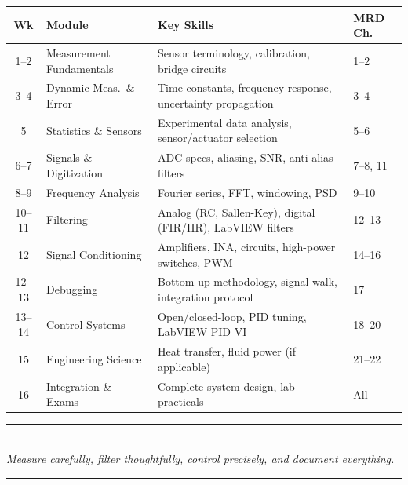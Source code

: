\documentclass[11pt,letterpaper]{article}
\begin{document}
\begin{table}[htbp]
\centering\small
\begin{tabularx}{\textwidth}{@{} c l X l @{}}
\toprule
\textbf{Wk} & \textbf{Module} & \textbf{Key Skills} & \textbf{MRD Ch.} \\
\midrule
1--2 & Measurement Fundamentals & Sensor terminology, calibration, bridge circuits & 1--2 \\
3--4 & Dynamic Meas.\ \& Error & Time constants, frequency response, uncertainty propagation & 3--4 \\
5 & Statistics \& Sensors & Experimental data analysis, sensor/actuator selection & 5--6 \\
6--7 & Signals \& Digitization & ADC specs, aliasing, SNR, anti-alias filters & 7--8, 11 \\
8--9 & Frequency Analysis & Fourier series, FFT, windowing, PSD & 9--10 \\
10--11 & Filtering & Analog (RC, Sallen-Key), digital (FIR/IIR), LabVIEW filters & 12--13 \\
12 & Signal Conditioning & Amplifiers, INA, circuits, high-power switches, PWM & 14--16 \\
12--13 & Debugging & Bottom-up methodology, signal walk, integration protocol & 17 \\
13--14 & Control Systems & Open/closed-loop, PID tuning, LabVIEW PID VI & 18--20 \\
15 & Engineering Science & Heat transfer, fluid power (if applicable) & 21--22 \\
16 & Integration \& Exams & Complete system design, lab practicals & All \\
\bottomrule
\end{tabularx}
\end{table}

\vspace{1cm}
\begin{center}
\textcolor{minesblue}{\rule{0.4\textwidth}{1pt}}\\[6pt]
\textit{Measure carefully, filter thoughtfully, control precisely, and document everything.}\\[6pt]
\textcolor{minesblue}{\rule{0.4\textwidth}{1pt}}
\end{center}
\end{document}
